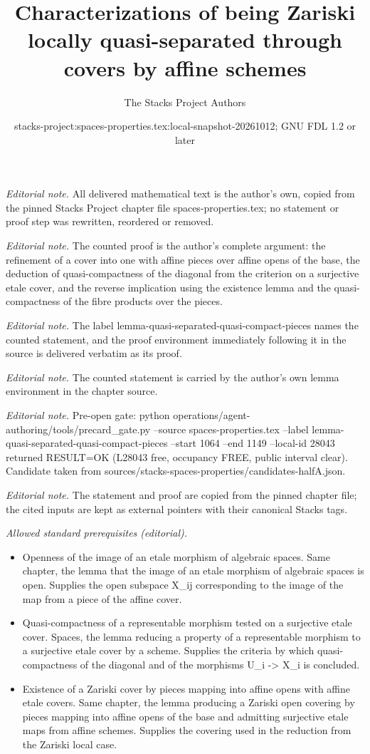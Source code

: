 \documentclass[10pt,a4paper]{amsart}
\title{Characterizations of being Zariski locally quasi-separated through covers by affine schemes}
\author{The Stacks Project Authors}
\date{stacks-project:spaces-properties.tex:local-snapshot-20261012; GNU FDL 1.2 or later}
\theoremstyle{plain}
\theoremstyle{definition}
\theoremstyle{remark}
\numberwithin{equation}{subsection}
\begin{document}
\maketitle
\noindent\textit{Editorial note.} All delivered mathematical text is the author's own, copied from the pinned Stacks Project chapter file spaces-properties.tex; no statement or proof step was rewritten, reordered or removed.\par\medskip
\noindent\textit{Editorial note.} The counted proof is the author's complete argument: the refinement of a cover into one with affine pieces over affine opens of the base, the deduction of quasi-compactness of the diagonal from the criterion on a surjective etale cover, and the reverse implication using the existence lemma and the quasi-compactness of the fibre products over the pieces.\par\medskip
\noindent\textit{Editorial note.} The label lemma-quasi-separated-quasi-compact-pieces names the counted statement, and the proof environment immediately following it in the source is delivered verbatim as its proof.\par\medskip
\noindent\textit{Editorial note.} The counted statement is carried by the author's own lemma environment in the chapter source.\par\medskip
\noindent\textit{Editorial note.} Pre-open gate: python operations/agent-authoring/tools/precard\_gate.py --source spaces-properties.tex --label lemma-quasi-separated-quasi-compact-pieces --start 1064 --end 1149 --local-id 28043 returned RESULT=OK (L28043 free, occupancy FREE, public interval clear). Candidate taken from sources/stacks-spaces-properties/candidates-halfA.json.\par\medskip
\noindent\textit{Editorial note.} The statement and proof are copied from the pinned chapter file; the cited inputs are kept as external pointers with their canonical Stacks tags.\par\medskip
\noindent\textit{Allowed standard prerequisites (editorial).}\begin{itemize}
\item Openness of the image of an etale morphism of algebraic spaces. Same chapter, the lemma that the image of an etale morphism of algebraic spaces is open. Supplies the open subspace X\_ij corresponding to the image of the map from a piece of the affine cover.
\item Quasi-compactness of a representable morphism tested on a surjective etale cover. Spaces, the lemma reducing a property of a representable morphism to a surjective etale cover by a scheme. Supplies the criteria by which quasi-compactness of the diagonal and of the morphisms U\_i -> X\_i is concluded.
\item Existence of a Zariski cover by pieces mapping into affine opens with affine etale covers. Same chapter, the lemma producing a Zariski open covering by pieces mapping into affine opens of the base and admitting surjective etale maps from affine schemes. Supplies the covering used in the reduction from the Zariski local case.
\end{itemize}\medskip
\end{document}
